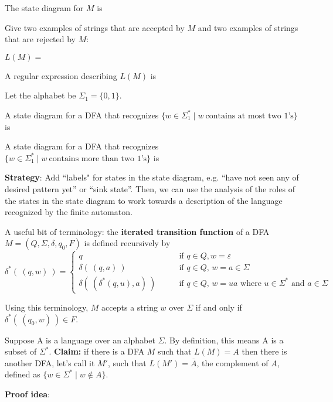 \documentclass[12pt, oneside]{article}
\begin{document}
The state diagram for $M$ is 

\vfill



Give two examples of strings that are accepted by $M$ and two examples of strings that are rejected by $M$:

\vfill



$L(M) = $

A regular expression describing $L(M)$ is




\newpage
Let the alphabet be $\Sigma_1 = \{0,1\}$.

A state diagram for a DFA that recognizes $\{w \in \Sigma_1^* \mid w~\text{contains at most two $1$'s} \}$ is

\vfill

A state diagram for a DFA that recognizes $\{w \in \Sigma_1^* \mid w~\text{contains more than two $1$'s} \}$ is

\vfill

\textbf{Strategy}: Add ``labels" for states in the state diagram, e.g. 
``have not seen any of desired pattern yet'' or ``sink state''.
Then, we can use the analysis of the roles of the states in the state diagram to work towards a 
description of the language recognized by the finite automaton. 

\vfill
A useful bit of terminology: the {\bf iterated transition function} of a DFA
$M = (Q, \Sigma, \delta, q_0, F)$ is defined recursively by
\[
\delta^* (~(q,w)~) 
=\begin{cases}
q  \qquad &\text{if $q \in Q, w = \varepsilon$} \\
\delta( ~(q,a)~) \qquad &\text{if $q \in Q$, $w = a \in \Sigma$ } \\
\delta(~(\delta^*(q,u), a) ~) \qquad &\text{if $q \in Q$, $w = ua$ where $u \in  \Sigma^*$ and $a \in \Sigma$}
\end{cases}
\]

Using  this terminology, $M$ accepts a string $w$ over $\Sigma$ if and only if $\delta^*( ~(q_0,w)~) \in F$.

\newpage
Suppose A is a language over an alphabet $\Sigma$. By definition, this means A is a subset of $\Sigma^*$.
{\bf Claim:} if there is a DFA $M$ such that $L(M) = A$ then there is another DFA, let's call it $M'$, such that 
$L(M') = \overline{A}$, the complement of $A$, defined as $\{ w \in \Sigma^* \mid w \notin A \}$.

{\bf Proof idea}:
\end{document}
